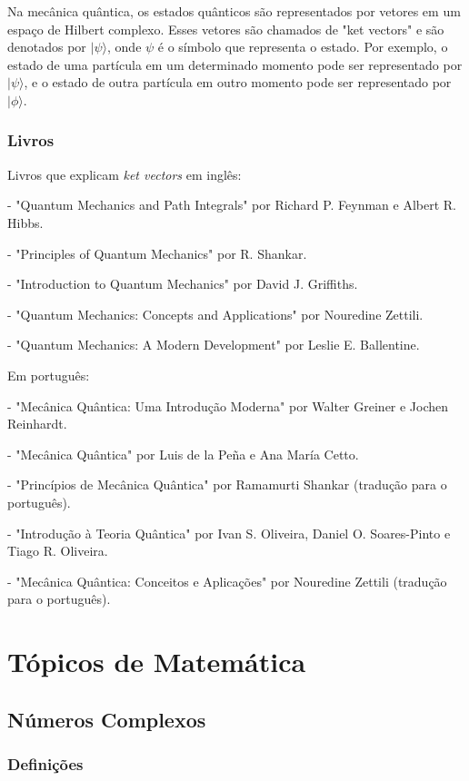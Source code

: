 \documentclass[12pt]{article}
\begin{document}
Na mecânica quântica, os estados quânticos são representados por vetores em um espaço de Hilbert complexo. Esses vetores são chamados de "ket vectors" e são denotados por $|\psi\rangle$, onde $\psi$ é o símbolo que representa o estado. Por exemplo, o estado de uma partícula em um determinado momento pode ser representado por $|\psi\rangle$, e o estado de outra partícula em outro momento pode ser representado por $|\phi\rangle$.

\subsubsection{Livros}

Livros que explicam \textit{ket vectors} em inglês:

- "Quantum Mechanics and Path Integrals" por Richard P. Feynman e Albert R. Hibbs.

- "Principles of Quantum Mechanics" por R. Shankar.

- "Introduction to Quantum Mechanics" por David J. Griffiths.

- "Quantum Mechanics: Concepts and Applications" por Nouredine Zettili.

- "Quantum Mechanics: A Modern Development" por Leslie E. Ballentine.

Em português:

- "Mecânica Quântica: Uma Introdução Moderna" por Walter Greiner e Jochen Reinhardt.

- "Mecânica Quântica" por Luis de la Peña e Ana María Cetto.

- "Princípios de Mecânica Quântica" por Ramamurti Shankar (tradução para o português).

- "Introdução à Teoria Quântica" por Ivan S. Oliveira, Daniel O. Soares-Pinto e Tiago R. Oliveira.

- "Mecânica Quântica: Conceitos e Aplicações" por Nouredine Zettili (tradução para o português).

\newpage
\section{Tópicos de Matemática}

\subsection{Números Complexos}

\subsubsection{Definições}
\end{document}
